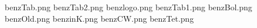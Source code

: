 benzTab.png
benzTab2.png
benzlogo.png
benzTab1.png
benzBol.png
benzOld.png
benzinK.png
benzCW.png
benzTet.png
